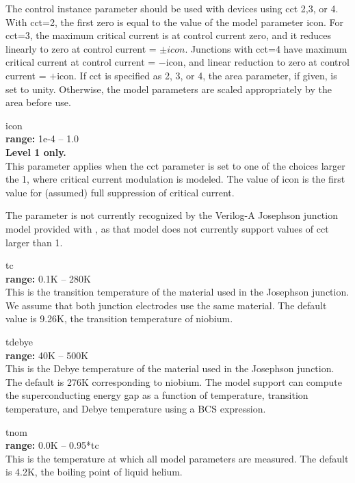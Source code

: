 \begin{description}
The {\vt control} instance parameter should be used with devices using
{\vt cct} 2,3, or 4.  With {\vt cct=2}, the first zero is equal to the
value of the model parameter {\vt icon}.  For {\vt cct=3}, the maximum
critical current is at control current zero, and it reduces linearly
to zero at control current = $\pm icon$.  Junctions with {\vt cct=4}
have maximum critical current at control current = $-${\vt icon}, and
linear reduction to zero at control current = $+${\vt icon}.  If {\vt
cct} is specified as 2, 3, or 4, the area parameter, if given, is set
to unity.  Otherwise, the model parameters are scaled appropriately by
the area before use.

\item{\vt icon}\\
{\bf range:} 1e-4 -- 1.0\\
{\bf Level 1 only.}\\
This parameter applies when the {\vt cct} parameter is set to one of
the choices larger the 1, where critical current modulation is
modeled.  The value of {\vt icon} is the first value for (assumed)
full suppression of critical current.

The parameter is not currently recognized by the Verilog-A Josephson
junction model provided with {\WRspice}, as that model does not
currently support values of {\vt cct} larger than 1.

\item{\vt tc}\\
{\bf range:} 0.1K -- 280K\\
This is the transition temperature of the material used in the
Josephson junction.  We assume that both junction electrodes use the
same material.  The default value is 9.26K, the transition temperature
of niobium.

\item{\vt tdebye}\\
{\bf range:} 40K -- 500K\\
This is the Debye temperature of the material used in the Josephson
junction.  The default is 276K corresponding to niobium.  The model
support can compute the superconducting energy gap as a function of
temperature, transition temperature, and Debye temperature using a BCS
expression.

\item{\vt tnom}\\
{\bf range:} 0.0K -- 0.95*{\vt tc}\\
This is the temperature at which all model parameters are measured. 
The default is 4.2K, the boiling point of liquid helium.


\end{description}
